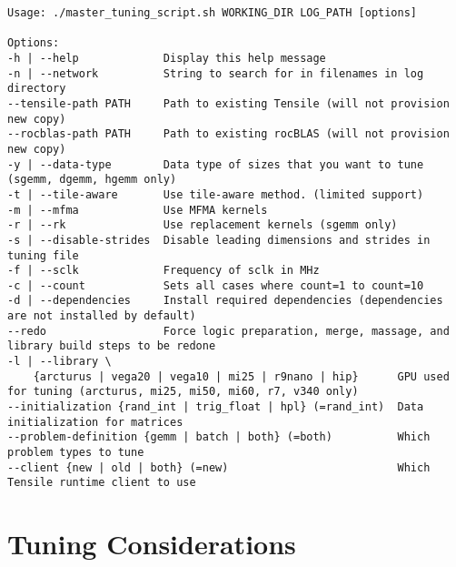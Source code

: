 \documentclass[]{article}
\begin{document}
\begin{lstlisting}
Usage: ./master_tuning_script.sh WORKING_DIR LOG_PATH [options]

Options:
-h | --help             Display this help message
-n | --network          String to search for in filenames in log directory
--tensile-path PATH     Path to existing Tensile (will not provision new copy)
--rocblas-path PATH     Path to existing rocBLAS (will not provision new copy)
-y | --data-type        Data type of sizes that you want to tune (sgemm, dgemm, hgemm only)
-t | --tile-aware       Use tile-aware method. (limited support)
-m | --mfma             Use MFMA kernels
-r | --rk               Use replacement kernels (sgemm only)
-s | --disable-strides  Disable leading dimensions and strides in tuning file
-f | --sclk             Frequency of sclk in MHz
-c | --count            Sets all cases where count=1 to count=10
-d | --dependencies     Install required dependencies (dependencies are not installed by default)
--redo                  Force logic preparation, merge, massage, and library build steps to be redone
-l | --library \
    {arcturus | vega20 | vega10 | mi25 | r9nano | hip}      GPU used for tuning (arcturus, mi25, mi50, mi60, r7, v340 only)
--initialization {rand_int | trig_float | hpl} (=rand_int)  Data initialization for matrices
--problem-definition {gemm | batch | both} (=both)          Which problem types to tune
--client {new | old | both} (=new)                          Which Tensile runtime client to use
\end{lstlisting}

\section{Tuning Considerations}
\end{document}

